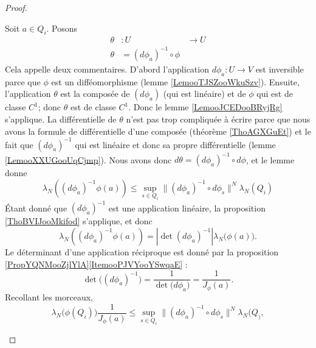 \begin{proof}
\begin{enumerate}
\begin{subproof}
                Soit \( a\in Q_i\). Posons
                \begin{equation}
                    \begin{aligned}
                        \theta&\colon U&\to U \\
                        \theta&=(d\phi_{a})^{-1}\circ\phi 
                    \end{aligned}
                \end{equation}
                Cela appelle deux commentaires. D'abord l'application \( d\phi_{a}\colon U\to V\) est inversible parce que \( \phi\) est un difféomorphisme (lemme \ref{LemooTJSZooWkuSzv}). Ensuite, l'application \( \theta\) est la composée de \( (d\phi_{a})\) (qui est linéaire) et de \( \phi\) qui est de classe \( C^1\); donc \( \theta\) est de classe \( C^1\). Donc le lemme \ref{LemooJCEDooBRyjRg} s'applique. La différentielle de \( \theta\) n'est pas trop compliquée à écrire parce que nous avons la formule de différentielle d'une composée (théorème \ref{ThoAGXGuEt}) et le fait que \( (d\phi_{a})^{-1}\) qui est linéaire et donc sa propre différentielle (lemme \ref{LemooXXUGooUqCjmp}). Nous avons donc \( d\theta=(d\phi_a)^{-1}\circ d\phi\), et le lemme donne
                \begin{equation}
                    \lambda_N\left( (d\phi_a)^{-1}\phi(a) \right)\leq \sup_{s\in Q_i}\|    (d\phi_a)^{-1}\circ d\phi_s  \|^N\lambda_N(Q_i)
                \end{equation}
                Étant donné que \( (d\phi_a)^{-1}\) est une application linéaire, la proposition \ref{ThoBVIJooMkifod} s'applique, et donc
                \begin{equation}
                    \lambda_N\left( (d\phi_a)^{-1}\phi(a) \right)=| \det(d\phi_a)^{-1} |\lambda_N\big( \phi(a) \big).
                \end{equation}
                Le déterminant d'une application réciproque est donné par la proposition \ref{PropYQNMooZjlYlA}\ref{ItemooPJVYooYSwqaE} :
                \begin{equation}
                    \det\big( (d\phi_a)^{-1} \big)=\frac{1}{ \det\big( d\phi_a \big) }=\frac{1}{ J_{\phi}(a) }.
                \end{equation}
                Recollant les morceaux,
                \begin{equation}
                    \lambda_N\big( \phi(Q_i) \big)\frac{1}{ J_{\phi}(a) }\leq \sup_{s\in Q_i}\| (d\phi_a)^{-1}\circ d\phi_s \|^N\lambda_N(Q_),
                \end{equation}

\end{subproof}
\end{enumerate}
\end{proof}
